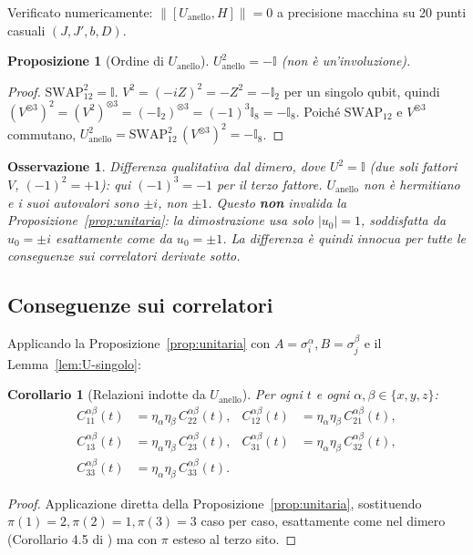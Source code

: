 \documentclass[11pt,a4paper]{article}
\newtheorem{proposizione}{Proposizione}
\newtheorem{corollario}{Corollario}
\newtheorem{osservazione}{Osservazione}
\begin{document}
Verificato numericamente: $\|[U_{\mathrm{anello}},H]\|=0$ a precisione macchina su 20 punti
casuali $(J,J',b,D)$.

\begin{proposizione}[Ordine di $U_{\mathrm{anello}}$]
\label{prop:U2}
$U_{\mathrm{anello}}^2=-\mathbb I$ (non è un'involuzione).
\end{proposizione}
\begin{proof}
$\mathrm{SWAP}_{12}^2=\mathbb I$. $V^2=(-iZ)^2=-Z^2=-\mathbb I_2$ per un singolo qubit, quindi
$(V^{\otimes3})^2=(V^2)^{\otimes3}=(-\mathbb I_2)^{\otimes3}=(-1)^3\mathbb I_8=-\mathbb I_8$.
Poiché $\mathrm{SWAP}_{12}$ e $V^{\otimes3}$ commutano,
$U_{\mathrm{anello}}^2=\mathrm{SWAP}_{12}^2\,(V^{\otimes3})^2=-\mathbb I_8$.
\end{proof}

\begin{osservazione}
Differenza qualitativa dal dimero, dove $U^2=\mathbb I$ (due soli fattori $V$, $(-1)^2=+1$): qui
$(-1)^3=-1$ per il terzo fattore. $U_{\mathrm{anello}}$ non è hermitiano e i suoi autovalori sono
$\pm i$, non $\pm1$. Questo \textbf{non} invalida la Proposizione~\ref{prop:unitaria}: la
dimostrazione usa solo $|u_0|=1$, soddisfatta da $u_0=\pm i$ esattamente come da $u_0=\pm1$. La
differenza è quindi innocua per tutte le conseguenze sui correlatori derivate sotto.
\end{osservazione}

\subsection{Conseguenze sui correlatori}

Applicando la Proposizione~\ref{prop:unitaria} con $A=\sigma_i^\alpha,B=\sigma_j^\beta$ e il
Lemma~\ref{lem:U-singolo}:

\begin{corollario}[Relazioni indotte da $U_{\mathrm{anello}}$]
\label{cor:U-correlatori}
Per ogni $t$ e ogni $\alpha,\beta\in\{x,y,z\}$:
\begin{align}
C_{11}^{\alpha\beta}(t) &= \eta_\alpha\eta_\beta\,C_{22}^{\alpha\beta}(t),
&
C_{12}^{\alpha\beta}(t) &= \eta_\alpha\eta_\beta\,C_{21}^{\alpha\beta}(t),\\
C_{13}^{\alpha\beta}(t) &= \eta_\alpha\eta_\beta\,C_{23}^{\alpha\beta}(t),
&
C_{31}^{\alpha\beta}(t) &= \eta_\alpha\eta_\beta\,C_{32}^{\alpha\beta}(t),\\
C_{33}^{\alpha\beta}(t) &= \eta_\alpha\eta_\beta\,C_{33}^{\alpha\beta}(t). & &
\end{align}
\end{corollario}
\begin{proof}
Applicazione diretta della Proposizione~\ref{prop:unitaria}, sostituendo $\pi(1)=2,\pi(2)=1,\pi(3)=3$
caso per caso, esattamente come nel dimero (Corollario 4.5 di
\texttt{}) ma con $\pi$ esteso al terzo sito.
\end{proof}
\end{document}
